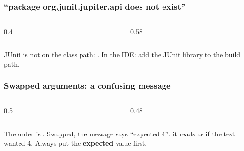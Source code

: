 \documentclass[aspectratio=169,10pt,compress]{beamer}
\begin{document}
\begin{frame}[t,fragile] \frametitle{``package org.junit.jupiter.api does not exist''}
  \begin{columns}[T]
    \begin{column}{0.4\textwidth}
    \end{column}
    \begin{column}{0.58\textwidth}
    \end{column}
  \end{columns}

  \vspace{0.2em}
  \small JUnit is not on the class path: . In the IDE: add the JUnit library to the build path.
\end{frame}




\begin{frame}[t,fragile] \frametitle{Swapped arguments: a confusing message}
  \begin{columns}[T]
    \begin{column}{0.5\textwidth}
    \end{column}
    \begin{column}{0.48\textwidth}
    \end{column}
  \end{columns}

  \vspace{0.2em}
  \small The order is . Swapped, the message says ``expected 4'': it reads as if
  the test wanted 4. Always put the \textbf{expected} value first.
\end{frame}
\end{document}
